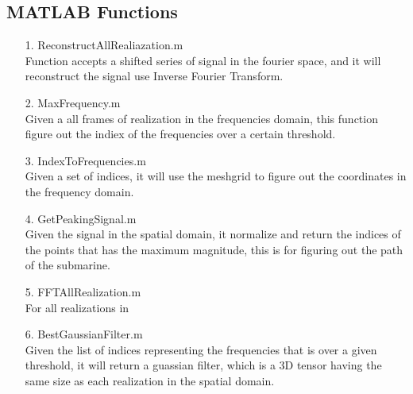 \documentclass{article}
\begin{document}
\begin{appendices}
\section{MATLAB Functions}
    \begin{enumerate}
        \item[1.] ReconstructAllRealiazation.m \\
        Function accepts a shifted series of signal in the fourier space, and it will reconstruct the signal use Inverse Fourier Transform.  
        \item[2.] MaxFrequency.m \\
        Given a all frames of realization in the frequencies domain, this function figure out the indiex of the frequencies over a certain threshold. 
        \item[3.] IndexToFrequencies.m \\
        Given a set of indices, it will use the meshgrid to figure out the coordinates in the frequency domain. 
        \item[4.] GetPeakingSignal.m \\
        Given the signal in the spatial domain, it normalize and return the indices of the points that has the maximum magnitude, this is for figuring out the path of the submarine. 
        \item[5.] FFTAllRealization.m \\
        For all realizations in 
        \item[6.] BestGaussianFilter.m \\
        Given the list of indices representing the frequencies that is over a given threshold, it will return a guassian filter, which is a 3D tensor having the same size as each realization in the spatial domain. 
    \end{enumerate}


\end{appendices}
\end{document}

